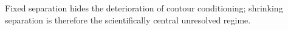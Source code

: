Fixed separation hides the deterioration of contour conditioning; shrinking separation is therefore the scientifically central unresolved regime.